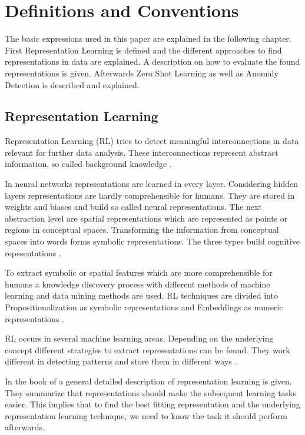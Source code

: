 \section{Definitions and Conventions}\label{theory}
The basic expressions used in this paper are explained in the following chapter. First Representation Learning is defined and the different approaches to find representations in data are explained. A description on how to evaluate the found representations is given. Afterwards Zero Shot Learning as well as Anomaly Detection is described and explained.
\subsection{Representation Learning}
Representation Learning (RL) tries to detect meaningful interconnections in data relevant for further data analysis. These interconnections represent abstract information, so called background knowledge \cite{lavrac_representation_2021}.

In neural networks representations are learned in every layer. Considering hidden layers representations are hardly comprehensible for humans. They are stored in weights and biases and build so called neural representations. The next abstraction level are spatial representations which are represented as points or regions in conceptual spaces. Transforming the information from conceptual spaces into words forms symbolic representations. The three types build cognitive repesentations \cite{gardenfors_conceptual_2000}.

To extract symbolic or spatial features which are more comprehensible for humans a knowledge discovery process with different methods of machine learning and data mining methods are used. RL techniques are divided into Propositionalization as symbolic representations and Embeddings as numeric representations \cite[p. 4]{lavrac_representation_2021}.

RL occurs in several machine learning areas. Depending on the underlying concept different strategies to extract representations can be found. They work different in detecting patterns and store them in different ways \cite{bishop_pattern_2006}.

In the book of  a general detailed description of representation learning is given. They summarize that representations should make the subsequent learning tasks easier. This implies that to find the best fitting representation and the underlying representation learning technique, we need to know the task it should perform afterwards.


